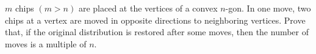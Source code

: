 $m$ chips $(m > n)$ are placed at the vertices of a convex $n$-gon. In one move, two chips at a vertex are moved in opposite directions to neighboring vertices. Prove that, if the original distribution is restored after some moves, then the number of moves is a multiple of $n$.
